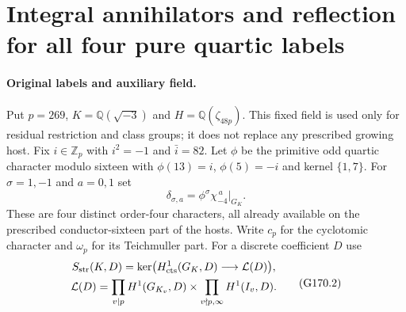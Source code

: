 \section{Integral annihilators and reflection for all four pure quartic labels}
\label{sec:quartic-abelian-reflection-strict}

\paragraph{Original labels and auxiliary field.}
Put $p=269$, $K=\mathbb Q(\sqrt{-3})$ and
$H=\mathbb Q(\zeta_{48p})$.
This fixed field is used only for residual restriction and class
groups; it does not replace any prescribed growing host.
Fix $i\in\mathbb Z_p$ with $i^2=-1$ and $\bar i=82$.
Let $\phi$ be the primitive odd quartic character modulo sixteen
with $\phi(13)=i$, $\phi(5)=-i$ and kernel $\{1,7\}$.
For $\sigma=1,-1$ and $a=0,1$ set
\[
              \delta_{\sigma,a}=\phi^\sigma\chi_{-4}^{\,a}|_{G_K}.
 \tag{G170.1}
\]
These are four distinct order-four characters, all already
available on the prescribed conductor-sixteen part of the hosts.
Write $c_p$ for the cyclotomic character and $\omega_p$ for
its Teichmuller part.  For a discrete coefficient $D$ use
\[
 \begin{gathered}
 S_{\rm str}(K,D)=\ker\bigl(H^1_{\rm cts}(G_K,D)
                                  \longrightarrow\mathcal L(D)\bigr),\\
 \mathcal L(D)=\prod_{v\mid p}H^1(G_{K_v},D)
                   \times\prod_{v\nmid p,\infty}H^1(I_v,D).
 \end{gathered}
 \tag{G170.2}
\]

